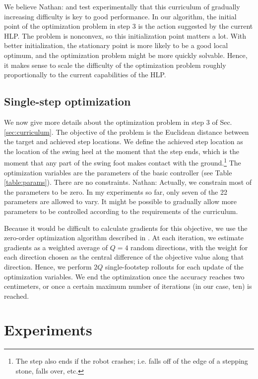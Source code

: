 \documentclass[a4paper]{article}
\newcommand{\nhatch}[1]{{\leavevmode\color{blue} Nathan: #1}}
\begin{document}
We believe \nhatch{and test experimentally} that this curriculum of gradually increasing difficulty is key to good performance.
In our algorithm, the initial point of the optimization problem in step 3 is the action suggested by the current HLP.
The problem is nonconvex, so this initialization point matters a lot.
With better initialization, the stationary point is more likely to be a good local optimum, and the optimization problem might be more quickly solvable.
Hence, it makes sense to scale the difficulty of the optimization problem roughly proportionally to the current capabilities of the HLP.

\subsection{Single-step optimization} \label{sec:optimization}

We now give more details about the optimization problem in step 3 of Sec. \ref{sec:curriculum}.
The objective of the problem is the Euclidean distance between the target and achieved step locations.
We define the achieved step location as the location of the swing heel at the moment that the step ends, which is the moment that any part of the swing foot makes contact with the ground.\footnote{The step also ends if the robot crashes; i.e. falls off of the edge of a stepping stone, falls over, etc.}
The optimization variables are the parameters of the basic controller (see Table \ref{table:params}).
There are no constraints.
\nhatch{Actually, we constrain most of the parameters to be zero. In my experiments so far, only seven of the 22 parameters are allowed to vary. It might be possible to gradually allow more parameters to be controlled according to the requirements of the curriculum.}

Because it would be difficult to calculate gradients for this objective, we use the zero-order optimization algorithm described in \cite{mania2018simple}.
At each iteration, we estimate gradients as a weighted average of $Q = 4$ random directions, with the weight for each direction chosen as the central difference of the objective value along that direction.
Hence, we perform $2Q$ single-footstep rollouts for each update of the optimization variables.
We end the optimization once the accuracy reaches two centimeters, or once a certain maximum number of iterations (in our case, ten) is reached.

\section{Experiments}
\end{document}
